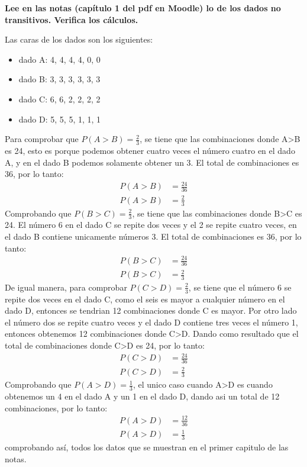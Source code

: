 \item \textbf{Lee en las notas (capítulo 1 del pdf en Moodle) lo de los dados no transitivos. Verifica los cálculos.}

Las caras de los dados son los siguientes:
\begin{itemize}
    \item dado A: 4, 4, 4, 4, 0, 0
    \item dado B: 3, 3, 3, 3, 3, 3
    \item dado C: 6, 6, 2, 2, 2, 2
    \item dado D: 5, 5, 5, 1, 1, 1
\end{itemize}
Para comprobar que $P(A>B)=\frac{2}{3}$, se tiene que las combinaciones donde A>B es 24, esto es porque podemos obtener cuatro veces el número cuatro en el dado A, y en el dado B podemos solamente obtener un 3. El total de combinaciones es 36, por lo tanto:
\begin{align*}
    P(A>B) & = \frac{24}{36} \\
    P(A>B) & = \frac{2}{3}
\end{align*}
Comprobando que $P(B>C)=\frac{2}{3}$, se tiene que las combinaciones donde B>C es 24. El número 6 en el dado C se repite dos veces y el 2 se repite cuatro veces, en el dado B contiene unicamente números 3. El total de combinaciones es 36, por lo tanto:
\begin{align*}
    P(B>C) & = \frac{24}{36} \\
    P(B>C) & = \frac{2}{3}
\end{align*}
De igual manera, para comprobar $P(C>D)=\frac{2}{3}$, se tiene que el número 6 se repite dos veces en el dado C, como el seis es mayor a cualquier número en el dado D, entonces se tendrian 12 combinaciones donde C es mayor. Por otro lado el número dos se repite cuatro veces y el dado D contiene tres veces el número 1, entonces obtenemos 12 combinaciones donde C>D. Dando como resultado que el total de combinaciones donde C>D es 24, por lo tanto:
\begin{align*}
    P(C>D) & = \frac{24}{36} \\
    P(C>D) & = \frac{2}{3}
\end{align*}
Comprobando que $P(A>D)=\frac{1}{3}$, el unico caso cuando A>D es cuando obtenemos un 4 en el dado A y un 1 en el dado D, dando asi un total de 12 combinaciones, por lo tanto:
\begin{align*}
    P(A>D) & = \frac{12}{36} \\
    P(A>D) & = \frac{1}{3}
\end{align*}
comprobando así, todos los datos que se muestran en el primer capitulo de las notas.